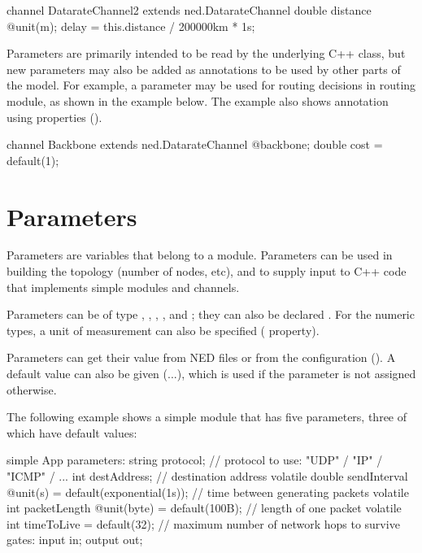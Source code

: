 \begin{ned}
channel DatarateChannel2 extends ned.DatarateChannel
{
    double distance @unit(m);
    delay = this.distance / 200000km * 1s;
}
\end{ned}

Parameters are primarily intended to be read by the underlying C++ class,
but new parameters may also be added as annotations to be used by other
parts of the model. For example, a  parameter may be used for
routing decisions in routing module, as shown in the example below. The
example also shows annotation using properties ().

\begin{ned}
channel Backbone extends ned.DatarateChannel
{
    @backbone;
    double cost = default(1);
}
\end{ned}


\section{Parameters}
\label{sec:ned-lang:parameters}

Parameters are variables that belong to a module. Parameters can be
used in building the topology (number of nodes, etc), and to supply
input to C++ code that implements simple modules and channels.

Parameters can be of type , ,
, ,  and ;
they can also be declared . For the numeric types, a unit of
measurement can also be specified ( property).

Parameters can get their value from NED files or from the configuration
(). A default value can also be given (...\ttt{)}),
which is used if the parameter is not assigned otherwise.

The following example shows a simple module that has five parameters, three
of which have default values:

\begin{ned}
simple App
{
    parameters:
        string protocol;       // protocol to use: "UDP" / "IP" / "ICMP" / ...
        int destAddress;       // destination address
        volatile double sendInterval @unit(s) = default(exponential(1s));
                               // time between generating packets
        volatile int packetLength @unit(byte) = default(100B);
                               // length of one packet
        volatile int timeToLive = default(32);
                               // maximum number of network hops to survive
    gates:
        input in;
        output out;
}
\end{ned}


